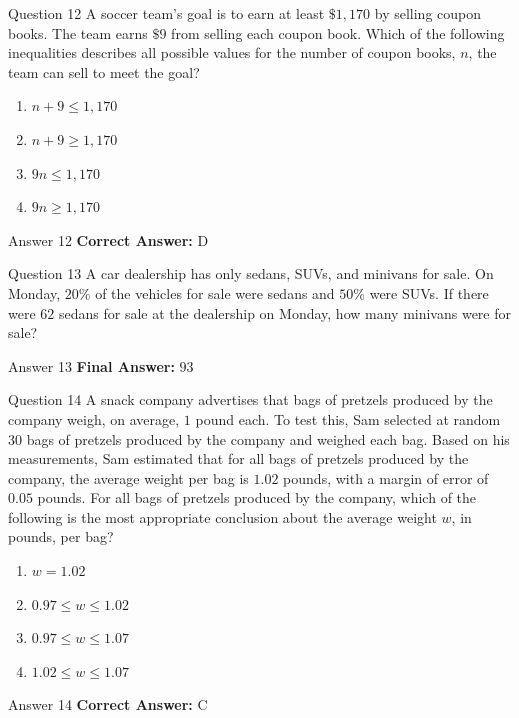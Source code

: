 \documentclass{beamer}
\begin{document}
\begin{frame}{Question 12}
\small
A soccer team's goal is to earn at least \(\$1{,}170\) by selling coupon books. The team earns \(\$9\) from selling each coupon book. Which of the following inequalities describes all possible values for the number of coupon books, \(n\), the team can sell to meet the goal?
\vspace{0.35cm}
\begin{enumerate}
    \item[A.] \(n + 9 \le 1{,}170\)
    \item[B.] \(n + 9 \ge 1{,}170\)
    \item[C.] \(9n \le 1{,}170\)
    \item[D.] \(9n \ge 1{,}170\)
\end{enumerate}
\end{frame}
\begin{frame}{Answer 12}
\small
\textbf{Correct Answer:} D
\end{frame}

\begin{frame}{Question 13}
\small
A car dealership has only sedans, SUVs, and minivans for sale. On Monday, \(20\%\) of the vehicles for sale were sedans and \(50\%\) were SUVs. If there were \(62\) sedans for sale at the dealership on Monday, how many minivans were for sale?
\end{frame}
\begin{frame}{Answer 13}
\small
\textbf{Final Answer:} $\boxed{93}$
\end{frame}

\begin{frame}{Question 14}
\small
A snack company advertises that bags of pretzels produced by the company weigh, on average, \(1\) pound each.
To test this, Sam selected at random \(30\) bags of pretzels produced by the company and weighed each bag.
Based on his measurements, Sam estimated that for all bags of pretzels produced by the company, the average weight per bag is \(1.02\) pounds, with a margin of error of \(0.05\) pounds.
For all bags of pretzels produced by the company, which of the following is the most appropriate conclusion about the average weight \(w\), in pounds, per bag?
\vspace{0.35cm}
\begin{enumerate}
    \item[A.] \(w = 1.02\)
    \item[B.] \(0.97 \le w \le 1.02\)
    \item[C.] \(0.97 \le w \le 1.07\)
    \item[D.] \(1.02 \le w \le 1.07\)
\end{enumerate}
\end{frame}
\begin{frame}{Answer 14}
\small
\textbf{Correct Answer:} C
\end{frame}
\end{document}
